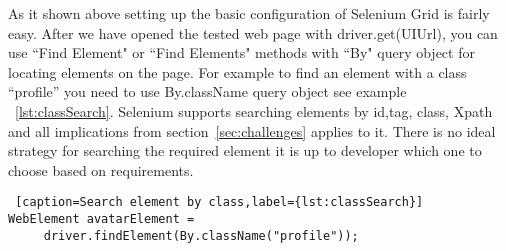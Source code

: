 	As it shown above setting up the basic configuration of Selenium Grid is fairly
	easy. After we have opened the tested web page with driver.get(UIUrl), you can
	use ``Find Element" or ``Find Elements" methods with ``By" query object for
	locating elements on the page. For example to find an element with a
	class ``profile'' you need to use By.className query object see example
	~\ref{lst:classSearch}. Selenium  supports searching elements by id,tag, class,
	Xpath and all implications from section~\ref{sec:challenges} applies to it. 
	There is no ideal strategy for searching the required element it is up
	to developer which one to choose based on requirements.
	
	\lstset{style=a1listing}
	\begin{lstlisting} [caption=Search element by class,label={lst:classSearch}]
WebElement avatarElement = 
	 driver.findElement(By.className("profile"));
	\end{lstlisting}